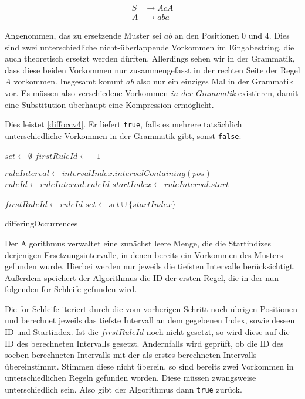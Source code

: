 \begin{align*}
    S &\rightarrow AcA\\
    A &\rightarrow aba
\end{align*}

Angenommen, das zu ersetzende Muster sei $ab$ an den Positionen $0$ und $4$. Dies sind zwei unterschiedliche nicht-überlappende Vorkommen im Eingabestring, die auch theoretisch ersetzt werden dürften. Allerdings sehen wir in der Grammatik, dass diese beiden Vorkommen nur zusammengefasst in der rechten Seite der Regel $A$ vorkommen. Insgesamt kommt $ab$ also nur ein einziges Mal in der Grammatik vor. Es müssen also verschiedene Vorkommen \emph{in der Grammatik} existieren, damit eine Substitution überhaupt eine Kompression ermöglicht.

Dies leistet \autoref{diffoccv4}. Er liefert \texttt{true}, falls es mehrere tatsächlich unterschiedliche Vorkommen in der Grammatik gibt, sonst \texttt{false}:

\begin{algorithm}[t]
    $set \leftarrow \emptyset$\;
    $firstRuleId \leftarrow -1$\;
     {
         { 
            \KwContinue\;
        }
        $ruleInterval \leftarrow intervalIndex.intervalContaining(pos)$\;
        $ruleId \leftarrow ruleInterval.ruleId$\;
        $startIndex \leftarrow ruleInterval.start$\;

         {
            $firstRuleId \leftarrow ruleId$\;
        }
         {
        }
        $set \leftarrow set \cup \{startIndex\}$\;
    }
    
    \caption{differingOccurrences}
    \label{diffoccv4}
\end{algorithm}

Der Algorithmus verwaltet eine zunächst leere Menge, die die Startindizes derjenigen Ersetzungsintervalle, in denen bereits ein Vorkommen des Musters gefunden wurde. Hierbei werden nur jeweils die tiefsten Intervalle berücksichtigt. Außerdem speichert der Algorithmus die ID der ersten Regel, die in der nun folgenden for-Schleife gefunden wird.

Die for-Schleife iteriert durch die vom vorherigen Schritt noch übrigen Positionen und berechnet jeweils das tiefste Intervall an dem gegebenen Index, sowie dessen ID und Startindex. Ist die $firstRuleId$ noch nicht gesetzt, so wird diese auf die ID des berechneten Intervalls gesetzt. Andernfalls wird geprüft, ob die ID des soeben berechneten Intervalls mit der als erstes berechneten Intervalls übereinstimmt. Stimmen diese nicht überein, so sind bereits zwei Vorkommen in unterschiedlichen Regeln gefunden worden. Diese müssen zwangsweise unterschiedlich sein. Also gibt der Algorithmus dann \texttt{true} zurück.

